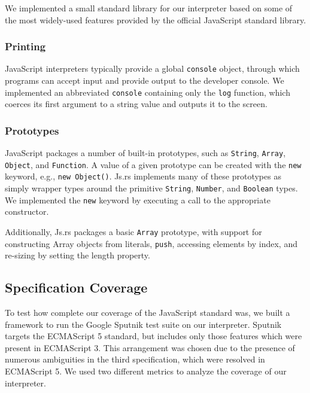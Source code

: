\documentclass{article}
\begin{document}
\begin{multicols}{2}
We implemented a small standard library for our interpreter based on some of the
most widely-used features provided by the official JavaScript standard library.

\subsubsection*{Printing}

JavaScript interpreters typically provide a global \texttt{console} object,
through which programs can accept input and provide output to the developer
console. We implemented an abbreviated \texttt{console} containing only the
\texttt{log} function, which coerces its first argument to a string value and
outputs it to the screen.

\subsubsection*{Prototypes}

JavaScript packages a number of built-in prototypes, such as \texttt{String},
\texttt{Array}, \texttt{Object}, and \texttt{Function}. A value of a given
prototype can be created with the \texttt{new} keyword, e.g., \texttt{new
Object()}. Js.rs implements many of these prototypes as simply wrapper types
around the primitive \texttt{String}, \texttt{Number}, and \texttt{Boolean}
types. We implemented the \texttt{new} keyword by executing a call to the
appropriate constructor. \newline

Additionally, Js.rs packages a basic \texttt{Array} prototype, with support for
constructing Array objects from literals, \texttt{push}, accessing elements by
index, and re-sizing by setting the length property.

\subsection{Specification Coverage}

To test how complete our coverage of the JavaScript standard was, we built a
framework to run the Google Sputnik test suite\cite{sputnik} on our interpreter.
Sputnik targets the ECMAScript 5 standard, but includes only those features
which were present in ECMAScript 3. This arrangement was chosen due to the
presence of numerous ambiguities in the third specification, which were resolved
in ECMAScript 5. We used two different metrics to analyze the coverage of our
interpreter.


\end{multicols}
\end{document}
